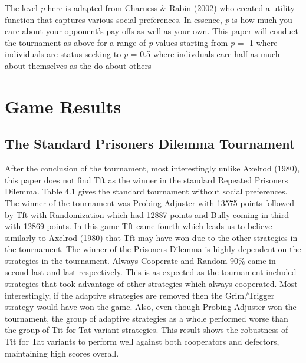 \documentclass[11pt,preprint]{elsarticle}
\numberwithin{equation}{section}
\numberwithin{figure}{section}
\numberwithin{table}{section}
\begin{document}
The level \emph{p} here is adapted from Charness \& Rabin (2002) who
created a utility function that captures various social preferences. In
essence, \emph{p} is how much you care about your opponent's pay-offs as
well as your own. This paper will conduct the tournament as above for a
range of \emph{p} values starting from \emph{p} = -1 where individuals
are status seeking to \emph{p} = 0.5 where indivduals care half as much
about themselves as the do about others

\hypertarget{game-results}{%
\section{Game Results}\label{game-results}}

\hypertarget{the-standard-prisoners-dilemma-tournament}{%
\subsection{The Standard Prisoners Dilemma
Tournament}\label{the-standard-prisoners-dilemma-tournament}}

After the conclusion of the tournament, most interestingly unlike
Axelrod (1980), this paper does not find Tft as the winner in the
standard Repeated Prisoners Dilemma. Table 4.1 gives the standard
tournament without social preferences. The winner of the tournament was
Probing Adjuster with 13575 points followed by Tft with Randomization
which had 12887 points and Bully coming in third with 12869 points. In
this game Tft came fourth which leads us to believe similarly to Axelrod
(1980) that Tft may have won due to the other strategies in the
tournament. The winner of the Prisoners Dilemma is highly dependent on
the strategies in the tournament. Always Cooperate and Random 90\% came
in second last and last respectively. This is as expected as the
tournament included strategies that took advantage of other strategies
which always cooperated. Most interestingly, if the adaptive strategies
are removed then the Grim/Trigger strategy would have won the game.
Also, even though Probing Adjuster won the tournament, the group of
adaptive strategies as a whole performed worse than the group of Tit for
Tat variant strategies. This result shows the robustness of Tit for Tat
variants to perform well against both cooperators and defectors,
maintaining high scores overall.

\newpage
\end{document}
